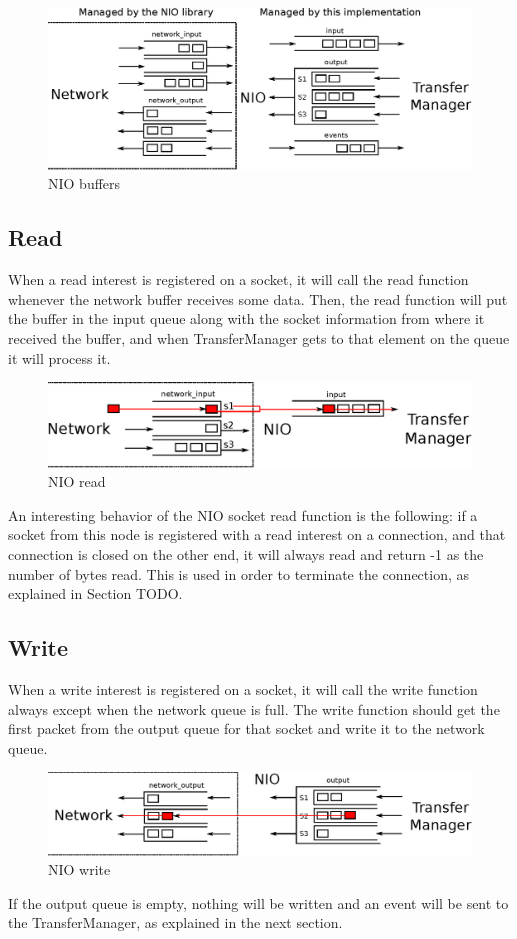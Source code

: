 \documentclass[11pt]{article}
\begin{document}
	\begin{figure}[H]
	\centering
	\includegraphics[width=170mm]{img/drawing3.eps}
	\caption[NIO buffers]{NIO buffers}
	\label{drawing3}
	\end{figure}
	
\subsection{Read}
	When a read interest is registered on a socket, it will call the read function whenever the network buffer receives some data. Then, the read function will put the buffer in the input queue along with the socket information from where it received the buffer, and when TransferManager gets to that element on the queue it will process it.
	\begin{figure}[H]
	\centering
	\includegraphics[width=160mm]{img/drawing5.eps}
	\caption[NIO read]{NIO read}
	\label{drawing5}
	\end{figure}
	An interesting behavior of the NIO socket read function is the following: if a socket from this node is registered with a read interest on a connection, and that connection is closed on the other end, it will always read and return -1 as the number of bytes read. This is used in order to terminate the connection, as explained in Section TODO.
	
\subsection{Write}
	When a write interest is registered on a socket, it will call the write function always except when the network queue is full. The write function should get the first packet from the output queue for that socket and write it to the network queue.
	\begin{figure}[H]
	\centering
	\includegraphics[width=170mm]{img/drawing6.eps}
	\caption[NIO write]{NIO write}
	\label{drawing6}
	\end{figure}
	If the output queue is empty, nothing will be written and an event will be sent to the TransferManager, as explained in the next section.
	
\end{document}
